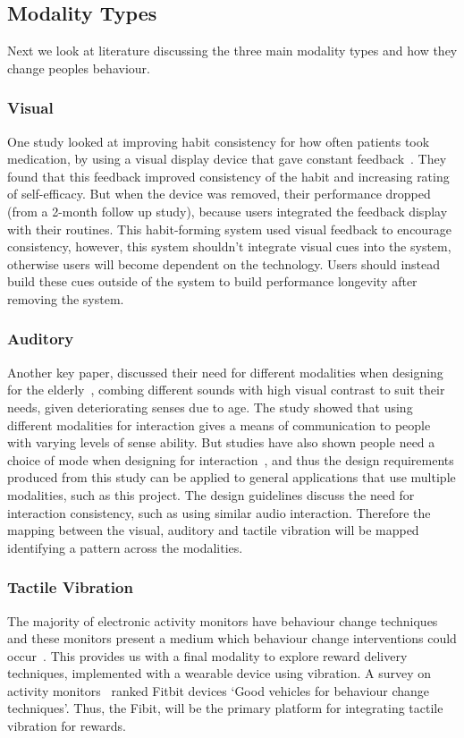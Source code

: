 \subsection{Modality Types}
Next we look at literature discussing the three main modality types and how they change peoples behaviour.

\subsubsection*{Visual}
One study looked at improving habit consistency for how often patients took medication, by using a visual display device that gave constant feedback~\cite{article_realtime_feedback_improving_medication_taking}. They found that this feedback improved consistency of the habit and increasing rating of self-efficacy. But when the device was removed, their performance dropped (from a 2-month follow up study), because users integrated the feedback display with their routines. This habit-forming system used visual feedback to encourage consistency, however, this system shouldn't integrate visual cues into the system, otherwise users will become dependent on the technology. Users should instead build these cues outside of the system to build performance longevity after removing the system.

\subsubsection*{Auditory}
Another key paper, discussed their need for different modalities when designing for the elderly~\cite{article_movipill_improving_medication_elders},
combing different sounds with high visual contrast to suit their needs, given deteriorating senses due to age.
The study showed that using different modalities for interaction gives a means of communication to people with varying levels of sense ability.
But studies have also shown people need a choice of mode when designing for interaction~\cite{article_user_centred_multimodal_reminders},
and thus the design requirements produced from this study can be applied to general applications that use multiple modalities, such as this project.
The design guidelines discuss the need for interaction consistency, such as using similar audio interaction.
Therefore the mapping between the visual, auditory and tactile vibration will be mapped identifying a pattern across the modalities.

\subsubsection*{Tactile Vibration}
The majority of electronic activity monitors have behaviour change techniques and these monitors present a medium which behaviour change interventions could occur~\cite{article_wearable_good}.
This provides us with a final modality to explore reward delivery techniques, implemented with a wearable device using vibration.
A survey on activity monitors~\cite{article_wearable_good} ranked Fitbit devices `Good vehicles for behaviour change techniques'.
Thus, the Fibit, will be the primary platform for integrating tactile vibration for rewards.

